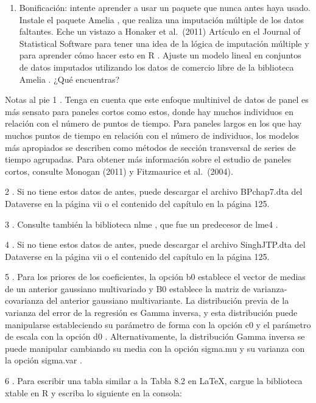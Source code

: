 \documentclass[
]{book}
\providecommand{\tightlist}{%
  \setlength{\itemsep}{0pt}\setlength{\parskip}{0pt}}
\begin{document}
\begin{enumerate}
\def\labelenumi{\arabic{enumi}.}
\setcounter{enumi}{4}
\tightlist
\item
  Bonificación: intente aprender a usar un paquete que nunca antes haya usado. Instale el paquete Amelia , que realiza una imputación múltiple de los datos faltantes. Eche un vistazo a Honaker et al.~(2011) Artículo en el Journal of Statistical Software para tener una idea de la lógica de imputación múltiple y para aprender cómo hacer esto en R . Ajuste un modelo lineal en conjuntos de datos imputados utilizando los datos de comercio libre de la biblioteca Amelia . ¿Qué encuentras?
\end{enumerate}

Notas al pie
1 .
Tenga en cuenta que este enfoque multinivel de datos de panel es más sensato para paneles cortos como estos, donde hay muchos individuos en relación con el número de puntos de tiempo. Para paneles largos en los que hay muchos puntos de tiempo en relación con el número de individuos, los modelos más apropiados se describen como métodos de sección transversal de series de tiempo agrupadas. Para obtener más información sobre el estudio de paneles cortos, consulte Monogan (2011) y Fitzmaurice et al.~(2004).

2 .
Si no tiene estos datos de antes, puede descargar el archivo BPchap7.dta del Dataverse en la página vii o el contenido del capítulo en la página 125.

3 .
Consulte también la biblioteca nlme , que fue un predecesor de lme4 .

4 .
Si no tiene estos datos de antes, puede descargar el archivo SinghJTP.dta del Dataverse en la página vii o el contenido del capítulo en la página 125.

5 .
Para los priores de los coeficientes, la opción b0 establece el vector de medias de un anterior gaussiano multivariado y B0 establece la matriz de varianza-covarianza del anterior gaussiano multivariante. La distribución previa de la varianza del error de la regresión es Gamma inversa, y esta distribución puede manipularse estableciendo su parámetro de forma con la opción c0 y el parámetro de escala con la opción d0 . Alternativamente, la distribución Gamma inversa se puede manipular cambiando su media con la opción sigma.mu y su varianza con la opción sigma.var .

6 .
Para escribir una tabla similar a la Tabla 8.2 en LaTeX, cargue la biblioteca xtable en R y escriba lo siguiente en la consola:
\end{document}
